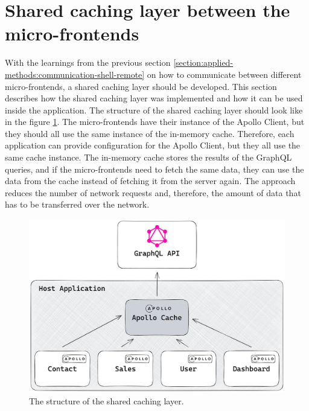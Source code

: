 \section{Shared caching layer between the micro-frontends}\label{section:applied-methods:shared-caching-layer}

\noindent With the learnings from the previous section \ref{section:applied-methods:communication-shell-remote} on how to communicate between different micro-frontends, a shared caching layer should be developed. This section describes how the shared caching layer was implemented and how it can be used inside the application. The structure of the shared caching layer should look like in the figure \ref{fig:applied-methods:structure-shared-caching-layer}. The micro-frontends have their instance of the Apollo Client, but they should all use the same instance of the in-memory cache. Therefore, each application can provide configuration for the Apollo Client, but they all use the same cache instance. The in-memory cache stores the results of the GraphQL queries, and if the micro-frontends need to fetch the same data, they can use the data from the cache instead of fetching it from the server again. The approach reduces the number of network requests and, therefore, the amount of data that has to be transferred over the network. 

\ifshowImages
  \begin{figure}[H]
  \centering
  \includegraphics[width=0.8\linewidth]{images/applied-methods/shared-caching-layer/shared-caching-layer.jpg}
  \caption{The structure of the shared caching layer.}\label{fig:applied-methods:structure-shared-caching-layer}
  \end{figure}
\fi

